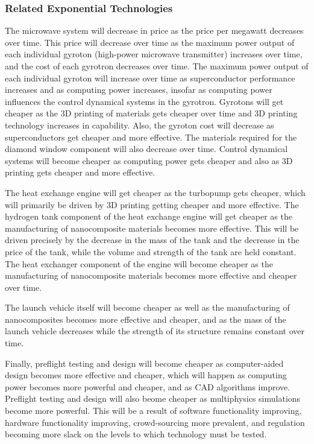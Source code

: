 \documentclass[letter,11pt]{article}
\begin{document}
\subsubsection{Related Exponential Technologies}

The microwave system will decrease in price as the price per megawatt decreases
over time.  This price will decrease over time as the maximum power output of
each individual gyroton (high-power microwave transmitter) increases over time,
and the cost of each gyrotron decreases over time.  The maximum power output of
each individual gyroton will increase over time as superconductor performance
increases and as computing power increases, insofar as computing power
influences the control dynamical systems in the gyrotron.  Gyrotons will get
cheaper as the 3D printing of materials gets cheaper over time and 3D printing
technology increases in capability.  Also, the gyroton cost will decrease as
superconductors get cheaper and more effective.  The materials required for the
diamond window component will also decrease over time.  Control dynamical
systems will become cheaper as computing power gets cheaper and also as 3D
printing gets cheaper and more effective.

The heat exchange engine will get cheaper as the turbopump gets cheaper, which
will primarily be driven by 3D printing getting cheaper and more effective.
The hydrogen tank component of the heat exchange engine will get cheaper as the
manufacturing of nanocomposite materials becomes more effective.  This will be
driven precisely by the decrease in the mass of the tank and the decrease in
the price of the tank, while the volume and strength of the tank are held
constant.  The heat exchanger component of the engine will become cheaper as
the manufacturing of nanocomposite materials becomes more effective and cheaper
over time.

The launch vehicle itself will become cheaper as well as the manufacturing of
nanocomposites becomes more effective and cheaper, and as the mass of the
launch vehicle decreases while the strength of its structure remains constant
over time.

Finally, preflight testing and design will become cheaper as computer-aided
design becomes more effective and cheaper, which will happen as computing power
becomes more powerful and cheaper, and as CAD algorithms improve.  Preflight
testing and design will also beome cheaper as multiphysics simulations become
more powerful.  This will be a result of software functionality improving,
hardware functionality improving, crowd-sourcing more prevalent, and regulation
becoming more slack on the levels to which technology must be tested.
\end{document}
